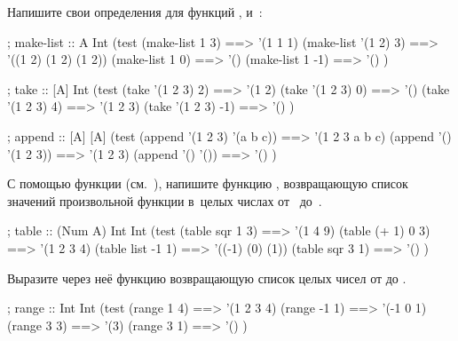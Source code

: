 \begin{Assignment}
Напишите свои определения для функций ,  и~:

\begin{Specification}
; make-list :: A Int \arrow [A]
(test 
  (make-list 1 3)      ==> '(1 1 1)
  (make-list '(1 2) 3) ==> '((1 2) (1 2) (1 2))
  (make-list 1 0)      ==> '()
  (make-list 1 -1)     ==> '() )
\end{Specification}

\vspace{-\medskipamount}
\begin{Specification}
; take :: [A] Int \arrow [A]
(test 
  (take '(1 2 3) 2)    ==>  '(1 2)
  (take '(1 2 3) 0)    ==>  '()
  (take '(1 2 3) 4)    ==>  '(1 2 3)
  (take '(1 2 3) -1)   ==>  '() )
\end{Specification}

\vspace{-\medskipamount}
\begin{Specification}
; append :: [A] [A] \arrow [A]
(test 
  (append '(1 2 3) '(a b c)) ==>  '(1 2 3 a b c)
  (append '() '(1 2 3))      ==>  '(1 2 3)
  (append '() '())           ==>  '() )
\end{Specification}
\end{Assignment}

\begin{Assignment}
С помощью функции  (см.~), напишите функцию , возвращающую список значений произвольной функции  в~целых числах от~ до~.

\begin{Specification}
; table :: (Num \arrow A) Int Int \arrow [A]
(test 
  (table sqr 1 3)    ==> '(1 4 9)
  (table (+ 1) 0 3)  ==> '(1 2 3 4)
  (table list -1 1)  ==> '((-1) (0) (1))
  (table sqr 3 1)    ==> '() )
\end{Specification}

Выразите через неё функцию  возвращающую список целых чисел от  до .
\begin{Specification}
; range :: Int Int \arrow [Int]
(test 
  (range 1 4)   ==> '(1 2 3 4)
  (range -1 1)  ==> '(-1 0 1)
  (range 3 3)   ==> '(3)
  (range 3 1)   ==> '() )
\end{Specification}
\end{Assignment}

